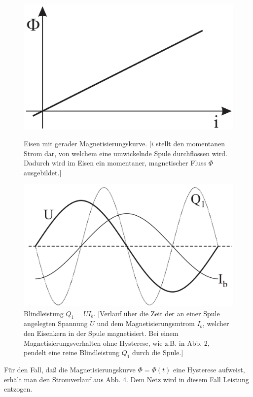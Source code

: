 \documentclass[12pt,a4paper,twoside]{article}
\theoremstyle{definition}
\begin{document}
\begin{figure}[H]
    \centering
    \begin{minipage}[b]{0.45\textwidth}
        \includegraphics[width=\textwidth]{grundlagen/abb2}
        \caption{Eisen mit gerader Magnetisierungskurve. [$i$ stellt den momentanen Strom dar, von welchem eine umwickelnde Spule durchflossen wird. Dadurch wird im Eisen ein momentaner, magnetischer Fluss $\Phi$ ausgebildet.]}
    \end{minipage}
    \hfill
    \begin{minipage}[b]{0.45\textwidth}
        \includegraphics[width=\textwidth]{grundlagen/abb3}
        \caption{Blindleistung $Q_1 = U I_b$. [Verlauf über die Zeit der an einer Spule angelegten Spannung $U$ und dem Magnetisierungsmtrom $I_b$, welcher den Eisenkern in der Spule magnetisiert. Bei einem Magnetisierungsverhalten ohne Hysterese, wie z.B. in Abb. 2, pendelt eine reine Blindleistung $Q_1$ durch die Spule.]}
    \end{minipage}
\end{figure}
Für den Fall, daß die Magnetisierungskurve $\Phi=\Phi(t)$ eine Hysterese aufweist, erhält man den Stromverlauf aus Abb. 4. Dem Netz wird in diesem Fall Leistung entzogen.
\end{document}
